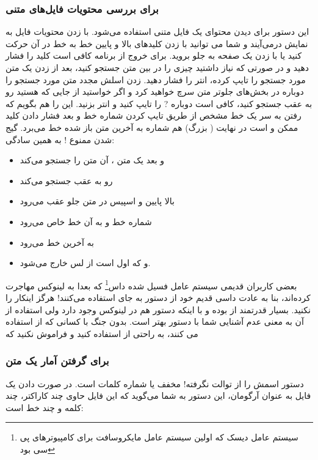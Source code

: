\subsubsection*{
 برای بررسی محتویات فایل‌های متنی}
این دستور برای دیدن محتوای یک فایل متنی استفاده می‌شود. با زدن 
 محتویات فایل به نمایش درمی‌آیند و شما می توانید با زدن کلیدهای بالا و پایین خط به خط در آن حرکت کنید یا با زدن 
 یک صفحه به جلو بروید. برای خروج از برنامه 
 کافی است کلید  را فشار دهید و در صورتی که نیاز داشتید چیزی را در بین متن جستجو کنید، بعد از زدن یک \lr{/} متن مورد جستجو را تایپ کرده، انتر را فشار دهید. زدن اسلش مجدد متن مورد جستجو را دوباره در بخش‌های جلوتر متن سرچ خواهید کرد و اگر خواستید از جایی که هستید رو به عقب جستجو کنید، کافی است دوباره ? را تایپ کنید و انتر بزنید. این را هم بگویم که رفتن به سر یک خط مشخص از طریق تایپ کردن شماره خط و بعد فشار دادن کلید  ممکن و است در نهایت  ( بزرگ) هم شماره به آخرین متن باز شده خط می‌برد.
گیج شدن ممنوع ! به همین سادگی:
\begin{itemize}
	\item \lr{/} و بعد یک متن ، آن متن را جستجو می‌کند
	\item {} رو به عقب جستجو می‌کند
	\item بالا پایین و اسپیس در متن جلو عقب می‌رود
	\item شماره خط و  به آن خط خاص می‌رود
	\item {} به آخرین خط می‌رود
	\item و  که اول 
 است از لس خارج می‌شود.
\end{itemize}
بعضی کاربران قدیمی سیستم عامل فسیل شده
داس\footnote{سیستم عامل دیسک که اولین سیستم عامل مایکروسافت برای کامپیوترهای پی سی بود}
که بعدا به لینوکس مهاجرت کرده‌اند، بنا به عادت داسی قدیم خود از دستور 
 به جای 
 استفاده می‌کنند! هرگز اینکار را نکنید.
 بسیار قدرتمند از 
 بوده و با اینکه دستور 
 هم در لینوکس وجود دارد ولی استفاده از آن به معنی عدم آشنایی شما با دستور بهتر 
 است. بدون جنگ با کسانی که از 
 استفاده می کنند، به راحتی از 
 استفاده کنید و فراموش نکنید که
\begin{flushleft}
\end{flushleft}

\subsubsection*{ برای گرفتن آمار یک متن}
دستور  اسمش را از توالت نگرفته!  مخفف 
 یا شماره کلمات است. در صورت دادن یک فایل به عنوان آرگومان، این دستور به شما می‌گوید که این فایل حاوی چند کاراکتر، چند کلمه و چند خط است:

